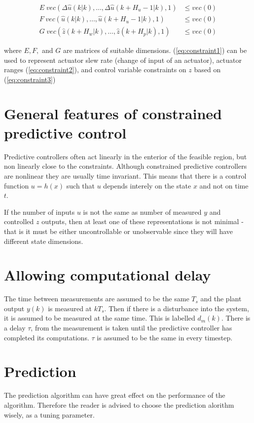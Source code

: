 \documentclass[a4paper]{article}
\begin{document}
\begin{align}
	E \hspace{3pt} vec( \Delta \hat{u}(k|k), \ldots, \Delta \hat{u}(k+H_u - 1|k), 1) &\leq vec(0) \label{eq:constraint1} \\ 
	F \hspace{3pt} vec( \hat{u}(k|k), \ldots, \hat{u}(k+H_u - 1|k), 1) &\leq vec(0) \label{eq:constraint2}\\
	G \hspace{3pt} vec( \hat{z}(k+H_w | k) , \ldots, \hat{z}(k+H_p|k), 1) &\leq vec(0) \label{eq:constraint3}
\end{align}

where $ E, F, $ and $ G $ are matrices of suitable dimensions. (\ref{eq:constraint1}) can be used to represent actuator slew rate (change of input of an actuator), actuator ranges (\ref{eq:constraint2}), and control variable constraints on $ z $ based on (\ref{eq:constraint3}) 

\section{General features of constrained predictive control}
Predictive controllers often act linearly in the enterior of the feasible region, but non linearly close to the constraints. Although constrained predictive controllers are nonlinear they are usually time invariant. This means that there is a control function $ u = h(x) $ such that $ u $ depends interely on the state $ x $ and not on time $ t $.

If the number of inputs $ u $ is not the same as number of measured $ y $ and controlled $ z $ outputs, then at least one of these representations is not minimal - that is it must be either uncontrollable or unobservable since they will have different state dimensions.

\section{Allowing computational delay}
The time between measurements are assumed to be the same $ T_s $ and the plant output $ y(k) $ is measured at $ k T_s $. Then if there is a disturbance into the system, it is assumed to be measured at the same time. This is labelled  $ d_m (k) $. There is a delay $ \tau $, from the measurement is taken until the predictive controller has completed its computations. $ \tau $ is assumed to be the same in every timestep.  


\section{Prediction}
The prediction algorithm can have great effect on the performance of the algorithm. Therefore the reader is advised to choose the prediction alorithm wisely, as a tuning parameter. 
\end{document}
